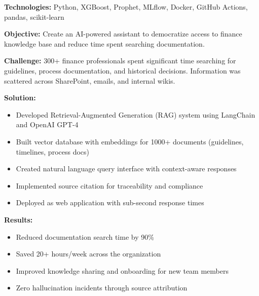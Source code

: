 \documentclass[11pt, a4paper]{awesome-cv}
\begin{document}
\begin{cvparagraph}
\textbf{Technologies:} Python, XGBoost, Prophet, MLflow, Docker, GitHub Actions, pandas, scikit-learn
\end{cvparagraph}

\vspace{1em}


\begin{cvparagraph}
\textbf{Objective:} Create an AI-powered assistant to democratize access to finance knowledge base and reduce time spent searching documentation.
\end{cvparagraph}

\begin{cvparagraph}
\textbf{Challenge:} 300+ finance professionals spent significant time searching for guidelines, process documentation, and historical decisions. Information was scattered across SharePoint, emails, and internal wikis.
\end{cvparagraph}

\begin{cvparagraph}
\textbf{Solution:}
\begin{itemize}
    \item Developed Retrieval-Augmented Generation (RAG) system using LangChain and OpenAI GPT-4
    \item Built vector database with embeddings for 1000+ documents (guidelines, timelines, process docs)
    \item Created natural language query interface with context-aware responses
    \item Implemented source citation for traceability and compliance
    \item Deployed as web application with sub-second response times
\end{itemize}
\end{cvparagraph}

\begin{cvparagraph}
\textbf{Results:}
\begin{itemize}
    \item Reduced documentation search time by 90\%
    \item Saved 20+ hours/week across the organization
    \item Improved knowledge sharing and onboarding for new team members
    \item Zero hallucination incidents through source attribution
\end{itemize}
\end{cvparagraph}
\end{document}
